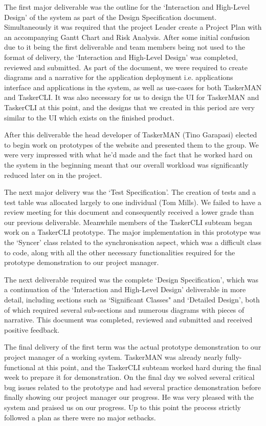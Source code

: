\documentclass{project}
\begin{document}
The first major deliverable was the outline for the `Interaction and High-Level Design' of the system as part of the Design Specification document. Simultaneously it was required that the project Leader create a Project Plan with an accompanying Gantt Chart and Risk Analysis. After some initial confusion due to it being the first deliverable and team members being not used to the format of delivery, the `Interaction and High-Level Design' was completed, reviewed and submitted. As part of the document, we were required to create diagrams and a narrative for the application deployment i.e. applications interface and applications in the system, as well as use-cases for both TaskerMAN and TaskerCLI. It was also necessary for us to design the UI for TaskerMAN and TaskerCLI at this point, and the designs that we created in this period are very similar to the UI which exists on the finished product.

After this deliverable the head developer of TaskerMAN (Tino Garapasi) elected to begin work on prototypes of the website and presented them to the group. We were very impressed with what he'd made and the fact that he worked hard on the system in the beginning meant that our overall workload was significantly reduced later on in the project.

The next major delivery was the  `Test Specification'. The creation of tests and a test table was allocated largely to one individual (Tom Mills). We failed to have a review meeting for this document and consequently received a lower grade than our previous deliverable. Meanwhile members of the TaskerCLI subteam began work on a TaskerCLI prototype. The major implementation in this prototype was the `Syncer' class related to the synchronisation aspect, which was a difficult class to code, along with all the other necessary functionalities required for the prototype demonstration to our project manager.

The next deliverable required was the complete  `Design Specification', which was a continuation of the  `Interaction and High-Level Design' deliverable in more detail, including sections such as  `Significant Classes" and  `Detailed Design', both of which required several sub-sections and numerous diagrams with pieces of narrative. This document was completed, reviewed and submitted and received positive feedback.

The final delivery of the first term was the actual prototype demonstration to our project manager of a working system. TaskerMAN was already nearly fully-functional at this point, and the TaskerCLI subteam worked hard during the final week to prepare it for demonstration. On the final day we solved several critical bug issues related to the prototype and had several practice demonstration before finally showing our project manager our progress. He was very pleased with the system and praised us on our progress. Up to this point the process strictly followed a plan as there were no major setbacks.
\end{document}
